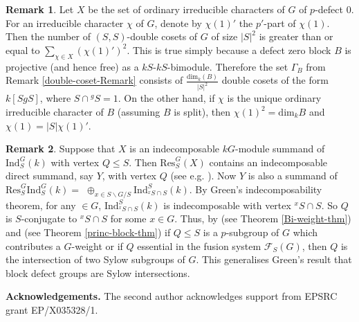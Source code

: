 \documentclass{amsart}
\theoremstyle{plain}\newtheorem{Theorem}{Theorem}[section]
\theoremstyle{plain}\newtheorem{Conjecture}[Theorem]{Conjecture}
\theoremstyle{plain}\newtheorem{Corollary}[Theorem]{Corollary}
\theoremstyle{plain}\newtheorem{Lemma}[Theorem]{Lemma}
\theoremstyle{plain}\newtheorem{Proposition}[Theorem]{Proposition}
\theoremstyle{definition}\newtheorem{Definition}[Theorem]{Definition}
\theoremstyle{definition}\newtheorem{Example}[Theorem]{Example}
\theoremstyle{definition}\newtheorem{Examples}[Theorem]{Examples}
\theoremstyle{definition}\newtheorem{Exercise}[Theorem]{Exercise}
\theoremstyle{definition}\newtheorem{Notation}[Theorem]{Notation}
\theoremstyle{definition}\newtheorem{Remark}[Theorem]{Remark}
\theoremstyle{definition}\newtheorem{Remarks}[Theorem]{Remarks}
\theoremstyle{plain}\newtheorem{Statement}[Theorem]{}
\def\CF{{\mathcal{F}}}  \def\OS{{\mathcal{O}S}}
\def\dim{\mathrm{dim}}   \def\tenkP{\otimes_{kP}} \def\tenkQ{\otimes_{kQ}}
\def\Ind{\mathrm{Ind}}    \def\tenC{\otimes_C}
\def\Res{\mathrm{Res}}           \def\tenOR{\otimes_{\mathcal{O}R}}
\begin{document}
\begin{Remark}  
Let  $X$  be the set of  ordinary  irreducible characters of   $G$ of $p$-defect $0$. 
 For an  irreducible character   $\chi$  of $G$,  denote by $ \chi(1)' $ the $ p'$-part of  
 $\chi(1)$. Then the number of   $(S,S)$-double cosets  of  $G$   of  size  $ |S|^2 $
is greater than or equal to   $ \sum_{\chi \in X} (\chi (1)')^2$.
This is true simply because a defect zero block  $B$  is projective  (and hence free) as a  
$kS$-$kS$-bimodule. Therefore   the set  $\Gamma_B $   from  Remark
\ref{double-coset-Remark} 
consists   of  $\frac{\dim_k(B)}{|S|^2} $ double   cosets of the form  $k[Sg S] $, where  
$S \cap {^g\!S}=1 $. On the other hand, if $\chi $ is the unique  ordinary irreducible 
character  of $B$ (assuming $B$ is  split), then  $ \chi(1)^2  =  \dim_k B  $  and  
$\chi(1)=|S| \chi(1)'$. 
\end{Remark}

\begin{Remark}   
Suppose that $X$ is an indecomposable  $kG$-module summand of   $\Ind_S^G (k) $  
with vertex $Q \leq S$.  Then   $\Res^G_S (X)$    contains an 
indecomposable direct summand, say $Y$, with vertex $Q$ 
(see e.g. \cite[Proposition 5.1.6]{LiBookI}).  Now   $Y$ is also a 
summand of  $\Res^G_S  \Ind_S^G(k)   =$
$\oplus_{x\in S\backslash G/S} \Ind_{{^x\!{S}} \cap  S}^S(k) $. 
By Green's indecomposability theorem,  for any $ \in G$,   
$\Ind_{{^x\!{S}} \cap S }^S(k) $  is  indecomposable with  vertex $ {^x\!{S}} \cap S  $.  So  
$Q$ is $S$-conjugate to  
$ {^x\!{S}} \cap S  $ for some $x \in G$.  Thus,   by \cite[Lemma 1]{Alp87} (see 
Theorem \ref{Bi-weight-thm})  and  \cite[Theorem 1.2]{Rob88} (see Theorem 
\ref{princ-block-thm})  if $Q  \leq  S$ is a $p$-subgroup  of $G$  which contributes  
a $G$-weight  or if $Q$  essential in the fusion system $\CF_S(G)$,  then $Q$ is  
the intersection  of two Sylow subgroups of  $G$.   This generalises  Green's  
result that block  defect groups  are Sylow intersections.
\end{Remark}



\bigskip\noindent
{\bf Acknowledgements.} 
The second author  acknowledges support from EPSRC grant EP/X035328/1.

\end{document}
